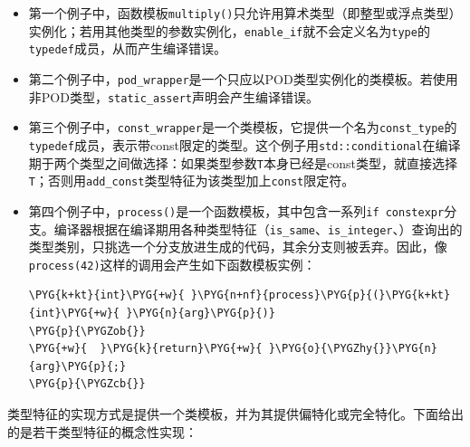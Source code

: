 \begin{itemize}
\item 第一个例子中，函数模板\texttt{multiply()}只允许用算术类型（即整型或浮点类型）实例化；若用其他类型的参数实例化，\texttt{enable\_\allowbreak{}if}就不会定义名为\texttt{type}的\texttt{typedef}成员，从而产生编译错误。



\item 第二个例子中，\texttt{pod\_\allowbreak{}wrapper}是一个只应以POD类型实例化的类模板。若使用非POD类型，\texttt{static\_\allowbreak{}assert}声明会产生编译错误。



\item 第三个例子中，\texttt{const\_\allowbreak{}wrapper}是一个类模板，它提供一个名为\texttt{const\_\allowbreak{}type}的\texttt{typedef}成员，表示带const限定的类型。这个例子用\texttt{std::\allowbreak{}conditional}在编译期于两个类型之间做选择：如果类型参数\texttt{T}本身已经是const类型，就直接选择\texttt{T}；否则用\texttt{add\_\allowbreak{}const}类型特征为该类型加上\texttt{const}限定符。



\item 第四个例子中，\texttt{process()}是一个函数模板，其中包含一系列\texttt{if constexpr}分支。编译器根据在编译期用各种类型特征（\texttt{is\_\allowbreak{}same}、\texttt{is\_\allowbreak{}integer}、）查询出的类型类别，只挑选一个分支放进生成的代码，其余分支则被丢弃。因此，像\texttt{process(\allowbreak{}42)}这样的调用会产生如下函数模板实例：



\begin{codeblockbg}
\begin{Verbatim}[commandchars=\\\{\},breaklines=true,breakanywhere=true,fontsize=\codefont,xleftmargin=17bp]
\PYG{k+kt}{int}\PYG{+w}{ }\PYG{n+nf}{process}\PYG{p}{(}\PYG{k+kt}{int}\PYG{+w}{ }\PYG{n}{arg}\PYG{p}{)}
\PYG{p}{\PYGZob{}}
\PYG{+w}{  }\PYG{k}{return}\PYG{+w}{ }\PYG{o}{\PYGZhy{}}\PYG{n}{arg}\PYG{p}{;}
\PYG{p}{\PYGZcb{}}
\end{Verbatim}
\end{codeblockbg}


\end{itemize}



类型特征的实现方式是提供一个类模板，并为其提供偏特化或完全特化。下面给出的是若干类型特征的概念性实现：


